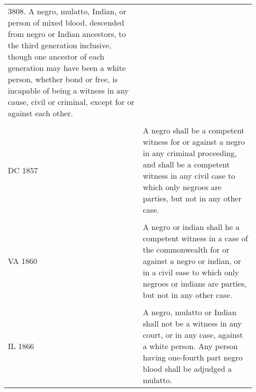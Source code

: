 \documentclass[12pt,]{article}
\begin{document}
\begin{longtable}[]{@{}ll@{}}
\begin{minipage}[t]{0.74\columnwidth}
3808. A negro, mulatto, Indian, or person of mixed blood, descended from
negro or Indian ancestors, to the third generation inclusive, though one
ancestor of each generation may have been a white person, whether bond
or free, is incapable of being a witness in any cause, civil or
criminal, except for or against each other.\strut
\end{minipage}\tabularnewline
\begin{minipage}[t]{0.20\columnwidth}\raggedright
\strut
\end{minipage} & \begin{minipage}[t]{0.74\columnwidth}\raggedright
\strut
\end{minipage}\tabularnewline
\begin{minipage}[t]{0.20\columnwidth}\raggedright
DC 1857\strut
\end{minipage} & \begin{minipage}[t]{0.74\columnwidth}\raggedright
A negro shall be a competent witness for or against a negro in any
criminal proceeding, and shall be a competent witness in any civil case
to which only negroes are parties, but not in any other case.\strut
\end{minipage}\tabularnewline
\begin{minipage}[t]{0.20\columnwidth}\raggedright
\strut
\end{minipage} & \begin{minipage}[t]{0.74\columnwidth}\raggedright
\strut
\end{minipage}\tabularnewline
\begin{minipage}[t]{0.20\columnwidth}\raggedright
VA 1860\strut
\end{minipage} & \begin{minipage}[t]{0.74\columnwidth}\raggedright
A negro or indian shall he a competent witness in a case of the
commonwealth for or against a negro or indian, or in a civil ease to
which only negroes or indians are parties, but not in any other
case.\strut
\end{minipage}\tabularnewline
\begin{minipage}[t]{0.20\columnwidth}\raggedright
\strut
\end{minipage} & \begin{minipage}[t]{0.74\columnwidth}\raggedright
\strut
\end{minipage}\tabularnewline
\begin{minipage}[t]{0.20\columnwidth}\raggedright
IL 1866\strut
\end{minipage} & \begin{minipage}[t]{0.74\columnwidth}\raggedright
A negro, mulatto or Indian shall not be a witness in any court, or in
any case, against a white person. Any person having one-fourth part
negro blood shall be adjudged a mulatto.\strut
\end{minipage}\tabularnewline
\bottomrule
\end{longtable}
\end{document}
